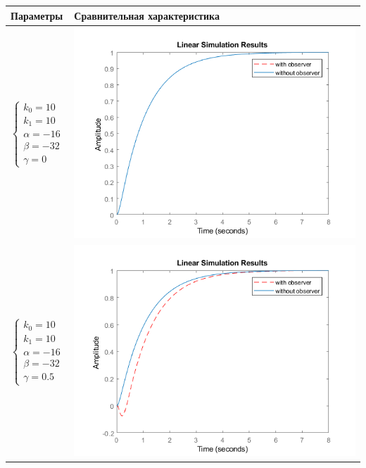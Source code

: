 \begin{longtable}{ | m{4cm} | m{8cm} | }
		\hline
		Параметры & Сравнительная характеристика \\ \hline
		
		$\begin{cases} k_0=10 \\ k_1=10 \\ \alpha=-16 \\ \beta= -32 \\ \gamma=0 \end{cases}$ &

		\begin{minipage}{.3\textwidth}
			\includegraphics[scale = 0.48]{images/e1.png}
		\end{minipage}
		\\\hline
		
		$\begin{cases} k_0=10 \\ k_1=10 \\ \alpha=-16 \\ \beta= -32 \\ \gamma=0.5 \end{cases}$ &

		\begin{minipage}{.3\textwidth}
			\includegraphics[scale = 0.48]{images/e2.png}
		\end{minipage}
		\\\hline
		

\end{longtable}
